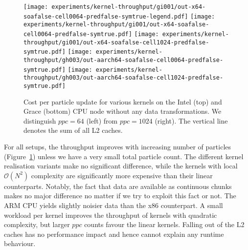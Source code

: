 %
%
\begin{figure}[htb]
  \begin{center}
    \texttt{[image: experiments/kernel-throughput/gi001/out-x64-soafalse-cell0064-predfalse-symtrue-legend.pdf]}
    \texttt{[image: experiments/kernel-throughput/gi001/out-x64-soafalse-cell0064-predfalse-symtrue.pdf]}
    \texttt{[image: experiments/kernel-throughput/gi001/out-x64-soafalse-cell1024-predfalse-symtrue.pdf]}     
    \texttt{[image: experiments/kernel-throughput/gh003/out-aarch64-soafalse-cell0064-predfalse-symtrue.pdf]}
    \texttt{[image: experiments/kernel-throughput/gh003/out-aarch64-soafalse-cell1024-predfalse-symtrue.pdf]}     
  \end{center}
  \caption{
   	Cost per particle update for various kernels on the Intel (top) and Grace (bottom) CPU node without any data transformations. 
   	We distinguish $ppc=64$ (left) from $ppc=1024$ (right). The vertical line denotes the sum of all L2 caches.
   \label{figure:results:baseline}
  }
\end{figure}


%
% 
For all setups, the throughput improves with increasing number of particles (Figure~\ref{figure:results:baseline}) unless we have a very small total particle count.
The different kernel realisation variants make no significant difference, while the kernels with local $\mathcal{O}(N^2)$ complexity are significantly more expensive than their linear counterparts.
Notably, the fact that data are available as continuous chunks makes no major difference no matter if we try to exploit this fact or not.
The ARM CPU yields slightly noisier data than the x86 counterpart.
A small workload per kernel improves the throughput of kernels with quadratic complexity, but larger $ppc$ counts favour the linear kernels.
Falling out of the L2 caches has no performance impact and hence cannot explain any runtime behaviour.


